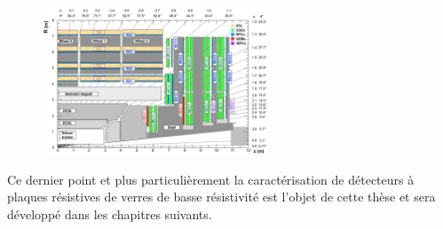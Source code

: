 \begin{itemize}[label=$\bullet$]
	\begin{figure}[ht!]
	\centering
	\includegraphics[width=0.60\textwidth]{CMS/endcap.png}
	\label{end}
\end{figure}
\end{itemize}
Ce dernier point et plus particulièrement la caractérisation de détecteurs à plaques résistives de verres de basse résistivité est l'objet de cette thèse et sera développé dans les chapitres suivants.